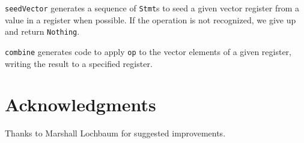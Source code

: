 \documentclass{article}
\begin{document}
\verb|seedVector| generates a sequence of \verb|Stmt|s to seed a given vector register from a value in a register when possible. If the operation  is not recognized, we give up and return \verb|Nothing|.

\verb|combine| generates code to apply \verb|op| to the vector elements of a given register, writing the result to a specified register.

\section*{Acknowledgments}

Thanks to Marshall Lochbaum for suggested improvements.



\end{document}
